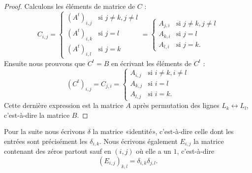 \begin{proof}
	Calculons les éléments de matrice de \( C\) :
	\begin{equation}
		C_{i,j}=\begin{cases}
			(A^t)_{i,j} & \text{si }  j\neq k, j\neq l      \\
			(A^t)_{i,k} & \text{si }  j=l                   \\
			(A^t)_{i,l} & \text{si }  j=k
		\end{cases}=
		\begin{cases}
			A_{j,i} & \text{si }  j\neq k, j\neq l          \\
			A_{k,i} & \text{si }  j=l                       \\
			A_{l,i} & \text{si }  j=k.
		\end{cases}
	\end{equation}
	Ensuite nous prouvons que \( C^t=B\) en écrivant les éléments de \( C^t\) :
	\begin{equation}
		(C^t)_{i,j}=C_{j,i}=\begin{cases}
			A_{i,j} & \text{si } i\neq k, i\neq l \\
			A_{k,j} & \text{si } i=l              \\
			A_{l,j} & \text{si } i=k.
		\end{cases}
	\end{equation}
	Cette dernière expression est la matrice \( A\) après permutation des lignes \( L_k\leftrightarrow L_l\), c'est-à-dire la matrice \( B\).
\end{proof}

Pour la suite nous écrivons \( \delta\) la matrice «identité», c'est-à-dire celle dont les entrées sont précisément les \( \delta_{i,k}\).  Nous écrivons également \( E_{i,j}\) la matrice contenant des zéros partout sauf en \( (i,j)\) où elle a un \( 1\), c'est-à-dire
\begin{equation}
	(E_{i,j})_{k,l}=\delta_{i,k}\delta_{j,l}.
\end{equation}

